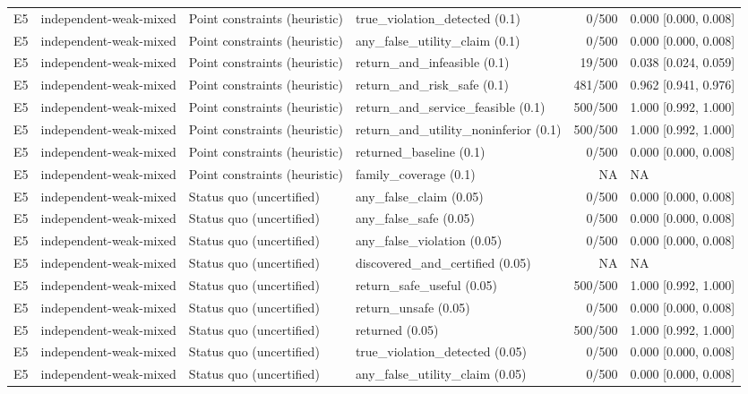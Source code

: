 \begin{longtable}{p{.04\linewidth}p{.18\linewidth}p{.19\linewidth}p{.16\linewidth}r p{.21\linewidth}}
E5 & independent-weak-mixed & Point constraints (heuristic) & true\_violation\_detected (0.1) & 0/500 & 0.000 [0.000, 0.008]\\
E5 & independent-weak-mixed & Point constraints (heuristic) & any\_false\_utility\_claim (0.1) & 0/500 & 0.000 [0.000, 0.008]\\
E5 & independent-weak-mixed & Point constraints (heuristic) & return\_and\_infeasible (0.1) & 19/500 & 0.038 [0.024, 0.059]\\
E5 & independent-weak-mixed & Point constraints (heuristic) & return\_and\_risk\_safe (0.1) & 481/500 & 0.962 [0.941, 0.976]\\
E5 & independent-weak-mixed & Point constraints (heuristic) & return\_and\_service\_feasible (0.1) & 500/500 & 1.000 [0.992, 1.000]\\
E5 & independent-weak-mixed & Point constraints (heuristic) & return\_and\_utility\_noninferior (0.1) & 500/500 & 1.000 [0.992, 1.000]\\
E5 & independent-weak-mixed & Point constraints (heuristic) & returned\_baseline (0.1) & 0/500 & 0.000 [0.000, 0.008]\\
E5 & independent-weak-mixed & Point constraints (heuristic) & family\_coverage (0.1) & NA & NA\\
E5 & independent-weak-mixed & Status quo (uncertified) & any\_false\_claim (0.05) & 0/500 & 0.000 [0.000, 0.008]\\
E5 & independent-weak-mixed & Status quo (uncertified) & any\_false\_safe (0.05) & 0/500 & 0.000 [0.000, 0.008]\\
E5 & independent-weak-mixed & Status quo (uncertified) & any\_false\_violation (0.05) & 0/500 & 0.000 [0.000, 0.008]\\
E5 & independent-weak-mixed & Status quo (uncertified) & discovered\_and\_certified (0.05) & NA & NA\\
E5 & independent-weak-mixed & Status quo (uncertified) & return\_safe\_useful (0.05) & 500/500 & 1.000 [0.992, 1.000]\\
E5 & independent-weak-mixed & Status quo (uncertified) & return\_unsafe (0.05) & 0/500 & 0.000 [0.000, 0.008]\\
E5 & independent-weak-mixed & Status quo (uncertified) & returned (0.05) & 500/500 & 1.000 [0.992, 1.000]\\
E5 & independent-weak-mixed & Status quo (uncertified) & true\_violation\_detected (0.05) & 0/500 & 0.000 [0.000, 0.008]\\
E5 & independent-weak-mixed & Status quo (uncertified) & any\_false\_utility\_claim (0.05) & 0/500 & 0.000 [0.000, 0.008]\\

\end{longtable}
